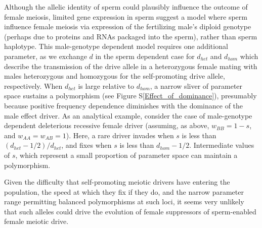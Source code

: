\documentclass[12pt,letterpaper]{article}
\newcommand{\gc}[1]{{ \color{red} #1}}
\begin{document}
Although the allelic identity of sperm could plausibly influence the outcome of female meiosis, 
	limited gene expression in sperm \citep[e.g.][]{Joseph2004}
	suggest a model where sperm influence female meiosis via expression of the fertilizing male's
	diploid genotype (perhaps due to proteins and RNAs packaged into the sperm), rather than sperm haplotype.
This male-genotype dependent model requires one additional parameter, as we exchange $d$ in the sperm dependent case for $d_{het}$ and $d_{hom}$ which describe the transmission of the drive allele in a heterozygous female mating with males heterozygous and homozygous for the self-promoting drive allele, respectively.  
When $d_{het}$ is large relative to $d_{hom}$, a narrow sliver of parameter space sustains a polymorphism (see Figure S\ref{Effect_of_dominance}), presumably because positive frequency dependence diminishes with the dominance of the male effect driver. 
As an analytical example, consider the case of male-genotype dependent deleterious recessive female driver 
	(assuming, as above, $w_{BB}=1-s$, and $w_{AA}=w_{AB}=1$). 
Here, a rare driver invades when $s$ is less than $(d_{het}-1/2)/d_{het}$, and fixes when $s$ is less than $d_{hom} - 1/2$. 
Intermediate values of $s$, which represent a small proportion of parameter space can maintain a polymorphism. 



Given the difficulty that self-promoting meiotic drivers have entering the population, the speed at
which they fix if they do, and the narrow parameter range permitting balanced polymorphisms at such loci,  
it seems very unlikely that such alleles could drive the evolution of female suppressors of sperm-enabled
female meiotic drive.
\end{document}

